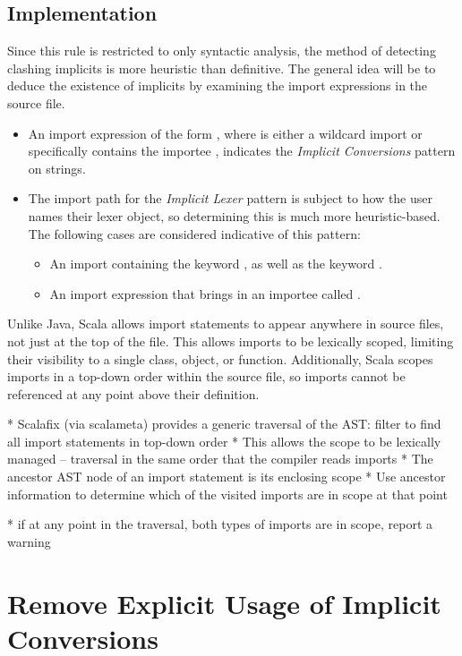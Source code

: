 \documentclass[../../main.tex]{subfiles}
\begin{document}
\subsection{Implementation}
Since this rule is restricted to only syntactic analysis, the method of detecting clashing implicits is more heuristic than definitive.
The general idea will be to deduce the existence of implicits by examining the import expressions in the source file.
\begin{itemize}
  \item An import expression of the form , where  is either a wildcard import or specifically contains the importee , indicates the \emph{Implicit Conversions} pattern on strings.
  \item The import path for the \emph{Implicit Lexer} pattern is subject to how the user names their lexer object, so determining this is much more heuristic-based. The following cases are considered indicative of this pattern:
  \begin{itemize}
    \item An import containing the keyword , as well as the keyword .
    \item An import expression that brings in an importee called .
  \end{itemize}
\end{itemize}
%
Unlike Java, Scala allows import statements to appear anywhere in source files, not just at the top of the file.
This allows imports to be lexically scoped, limiting their visibility to a single class, object, or function.
Additionally, Scala scopes imports in a top-down order within the source file, so imports cannot be referenced at any point above their definition.

* Scalafix (via scalameta) provides a generic traversal of the AST: filter to find all import statements in top-down order
* This allows the scope to be lexically managed -- traversal in the same order that the compiler reads imports
* The ancestor AST node of an import statement is its enclosing scope
* Use ancestor information to determine which of the visited imports are in scope at that point

* if at any point in the traversal, both types of imports are in scope, report a warning

\section{Remove Explicit Usage of Implicit Conversions}
\end{document}
